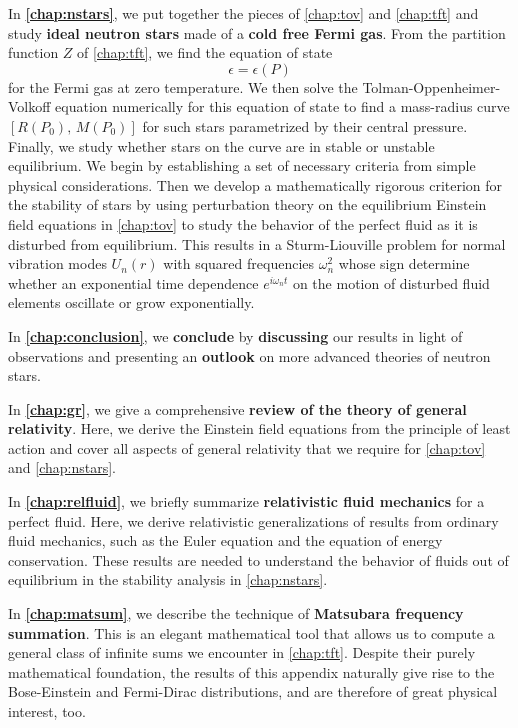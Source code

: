 In \textbf{\cref{chap:nstars}}, we put together the pieces of \cref{chap:tov} and \cref{chap:tft} and study \textbf{ideal neutron stars} made of a \textbf{cold free Fermi gas}.
From the partition function $Z$ of \cref{chap:tft}, we find the equation of state
\begin{equation*}
	\epsilon = \epsilon(P)
\end{equation*}
for the Fermi gas at zero temperature.
We then solve the Tolman-Oppenheimer-Volkoff equation numerically for this equation of state to find a mass-radius curve $[R(P_0), \, M(P_0)]$ for such stars parametrized by their central pressure.
Finally, we study whether stars on the curve are in stable or unstable equilibrium.
We begin by establishing a set of necessary criteria from simple physical considerations.
Then we develop a mathematically rigorous criterion for the stability of stars by using perturbation theory on the equilibrium Einstein field equations in \cref{chap:tov} to study the behavior of the perfect fluid as it is disturbed from equilibrium.
This results in a Sturm-Liouville problem for normal vibration modes $U_n(r)$ with squared frequencies $\omega_n^2$ whose sign determine whether an exponential time dependence $e^{i \omega_n t}$ on the motion of disturbed fluid elements oscillate or grow exponentially.

In \textbf{\cref{chap:conclusion}}, we \textbf{conclude} by \textbf{discussing} our results in light of observations and presenting an \textbf{outlook} on more advanced theories of neutron stars.

In \textbf{\cref{chap:gr}}, we give a comprehensive \textbf{review of the theory of general relativity}.
Here, we derive the Einstein field equations from the principle of least action and cover all aspects of general relativity that we require for \cref{chap:tov} and \cref{chap:nstars}.

In \textbf{\cref{chap:relfluid}}, we briefly summarize \textbf{relativistic fluid mechanics} for a perfect fluid.
Here, we derive relativistic generalizations of results from ordinary fluid mechanics, such as the Euler equation and the equation of energy conservation.
These results are needed to understand the behavior of fluids out of equilibrium in the stability analysis in \cref{chap:nstars}.

In \textbf{\cref{chap:matsum}}, we describe the technique of \textbf{Matsubara frequency summation}.
This is an elegant mathematical tool that allows us to compute a general class of infinite sums we encounter in \cref{chap:tft}.
Despite their purely mathematical foundation, the results of this appendix naturally give rise to the Bose-Einstein and Fermi-Dirac distributions, and are therefore of great physical interest, too.

